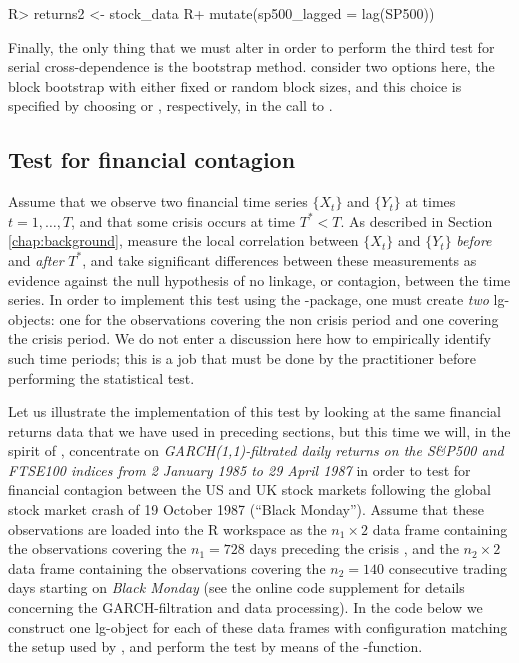 \begin{example}
R> returns2 <- stock_data %
R+   mutate(sp500_lagged = lag(SP500))
\end{example}

Finally, the only thing that we must alter in order to perform the third test for serial cross-dependence is the bootstrap method. \citet{laca:tjos:2018} consider two options here, the block bootstrap with either fixed \citep{kuns:1989} or random \citep{poli:roma:1994} block sizes, and this choice is specified by choosing  or , respectively, in the call to .

\subsection{Test for financial contagion}\label{chap:cont}

Assume that we observe two financial time series \(\{X_t\}\) and \(\{Y_t\}\) at times \(t = 1,\ldots,T\), and that some crisis occurs at time \(T^* < T\). As described in Section \ref{chap:background}, \citet{stov:tjos:huft:2014} measure the local correlation between \(\{X_t\}\) and \(\{Y_t\}\) \emph{before} and \emph{after} \(T^*\), and take significant differences between these measurements as evidence against the null hypothesis of no linkage, or contagion, between the time series. In order to implement this test using the -package, one must create \emph{two} lg-objects: one for the observations covering the non crisis period and one covering the crisis period. We do not enter a discussion here how to empirically identify such time periods; this is a job that must be done by the practitioner before performing the statistical test.

Let us illustrate the implementation of this test by looking at the same financial returns data that we have used in preceding sections, but this time we will, in the spirit of \citet{stov:tjos:huft:2014}, concentrate on \emph{GARCH(1,1)-filtrated daily returns on the S\&P500 and FTSE100 indices from 2 January 1985 to 29 April 1987} in order to test for financial contagion between the US and UK stock markets following the global stock market crash of 19 October 1987 (``Black Monday''). Assume that these observations are loaded into the R workspace as the \(n_1 \times 2\) data frame  containing the observations covering the \(n_1 = 728\) days preceding the crisis , and the \(n_2 \times 2\) data frame  containing the observations covering the \(n_2 = 140\) consecutive trading days starting on \emph{Black Monday} (see the online code supplement for details concerning the GARCH-filtration and data processing). In the code below we construct one lg-object for each of these data frames with configuration matching the setup used by \citet{stov:tjos:huft:2014}, and perform the test by means of the -function.

